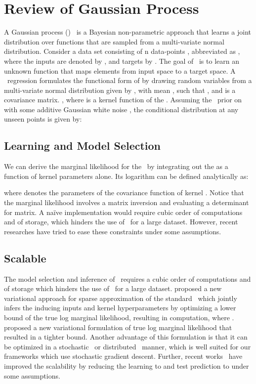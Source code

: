 \documentclass{article} \usepackage{iclr2021_conference,times}
\newcommand{\GP}{}
\begin{document}
\section{Review of Gaussian Process} 
\label{sec:review}
A Gaussian process (\GP)~\citep{Rasmussen06gaussianprocesses} is a Bayesian non-parametric approach that learns a joint distribution over functions that are sampled from a multi-variate normal distribution. Consider a data set consisting of n data-points , abbreviated as , where the inputs are denoted by , and targets by .
The goal of \GP\ is to learn an unknown function  that maps elements from input space to a target space. A \GP\ regression formulates the functional form of  by drawing random variables from a multi-variate normal distribution given by ,
with mean , such that , and  is a covariance matrix. , where  is a kernel function of the \GP. Assuming the \GP\ prior on  with some additive Gaussian white noise , the conditional distribution at any unseen points  is given by:

\vspace{-0.05in}
\subsection{Learning and Model Selection}
\vspace{-0.05in}
We can derive the marginal likelihood for the \GP\ by integrating out the  as a function of kernel parameters alone. Its logarithm can be defined analytically as:

where  denotes the parameters of the covariance function of kernel  .  
Notice that the marginal likelihood involves a matrix inversion and evaluating a determinant for  matrix. A na\"ive implementation would require cubic order of computations  and  of storage, which hinders the use of \GP\ for a large dataset. However, recent researches have tried to ease these constraints under some assumptions.  

\vspace{-0.05in}
\subsection{Scalable \GP}
\vspace{-0.05in}
The model selection and inference of \GP\ requires a cubic order of computations  and  of storage which hinders the use of \GP\ for a large dataset. 
\citet{pmlr-v5-titsias09a} proposed a new variational approach for sparse approximation of the standard \GP\, which jointly infers the inducing inputs and kernel hyperparameters by optimizing a lower bound of the true log marginal likelihood, resulting in  computation, where . \citet{hensman2013gaussian} proposed a new variational formulation of true log marginal likelihood that resulted in a tighter bound. Another advantage of this formulation is that it can be optimized in a stochastic~\citep{hensman2013gaussian} or distributed~\citep{dai2014gaussian,gal2014distributed} manner, which is well suited for our frameworks which use stochastic gradient descent. Further, recent works~\citep{wilson2015kernel,wilson2015thoughts,wilson2016stochastic} have improved the scalability by reducing the learning to  and test prediction to  under some assumptions. 
\end{document}

